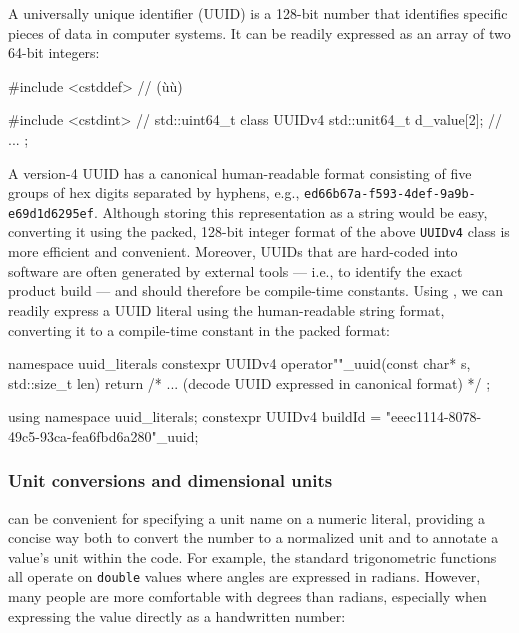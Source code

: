 A universally unique identifier (UUID) is a 128-bit number that
identifies specific pieces of data in computer systems. It can be
readily expressed as an array of two 64-bit integers:

\begin{emcppshiddenlisting}[emcppsbatch=e18]
#include <cstddef>  // (ù{}ù)
\end{emcppshiddenlisting}
\begin{emcppslisting}[emcppsbatch=e18]
#include <cstdint>  // std::uint64_t
class UUIDv4
{
    std::unit64_t d_value[2];
    // ...
};
\end{emcppslisting}

\noindent A version-4 UUID has a canonical human-readable format consisting of
five groups of hex digits separated by hyphens, e.g.,
\lstinline!ed66b67a-f593-4def-9a9b-e69d1d6295ef!. Although storing this
representation as a string would be easy, converting it using the
packed, 128-bit integer format of the above \lstinline!UUIDv4! class is
more efficient and convenient. Moreover, UUIDs that are hard-coded into
software are often generated by external tools --- i.e., to identify the
exact product build --- and should therefore be compile-time constants.
Using , we can readily express a UUID literal using the
human-readable string format, converting it to a compile-time constant
in the packed format:

\begin{emcppslisting}[emcppsbatch=e18]
namespace uuid_literals
{
    constexpr UUIDv4 operator""_uuid(const char* s, std::size_t len)
    {
        return { /* ... (decode UUID expressed in canonical format) */ };
    }
}

using namespace uuid_literals;
constexpr UUIDv4 buildId = "eeec1114-8078-49c5-93ca-fea6fbd6a280"_uuid;
\end{emcppslisting}


\subsubsection[Unit conversions and dimensional units]{Unit conversions and dimensional units}\label{unit-conversions-and-dimensional-units}

 can be convenient for specifying a unit name on a numeric
literal, providing a concise way both to convert the number to a
normalized unit and to annotate a value's unit within the code. For
example, the standard trigonometric functions all operate on
\lstinline!double! values where angles are expressed in radians. However,
many people are more comfortable with degrees than radians, especially
when expressing the value directly as a handwritten number:

